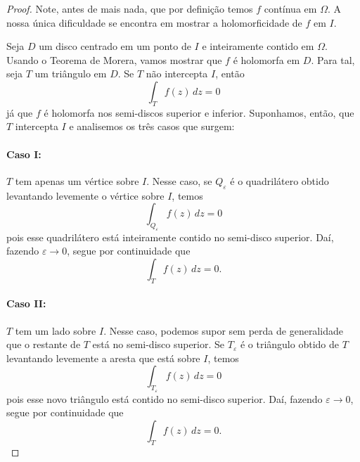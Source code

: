     \begin{proof}
        Note, antes de mais nada, que por definição temos $f$ contínua em $\Omega$.
        A nossa única dificuldade se encontra em mostrar a holomorficidade de $f$ em $I$.
        
        Seja $D$ um disco centrado em um ponto de $I$ e inteiramente contido em $\Omega$.
        Usando o Teorema de Morera, vamos mostrar que $f$ é holomorfa em $D$. Para tal,
        seja $T$ um triângulo em $D$. Se $T$ não intercepta $I$, então
        \begin{equation*}
            \int_T f(z) \, dz = 0
        \end{equation*}
        já que $f$ é holomorfa nos semi-discos superior e inferior. 
        Suponhamos, então, que $T$ intercepta $I$ e analisemos os três casos que surgem:
        \paragraph{Caso I:} $T$ tem apenas um vértice sobre $I$. Nesse caso, se 
        $Q_\varepsilon$ é o quadrilátero obtido levantando levemente o vértice sobre $I$, 
        temos
        \begin{equation*}
            \int_{Q_\varepsilon} f(z) \,dz = 0
        \end{equation*}
        pois esse quadrilátero está inteiramente contido no semi-disco superior. Daí,
        fazendo $\varepsilon\to 0$, segue por continuidade que
        \begin{equation*}
            \int_T f(z) \, dz = 0.
        \end{equation*}
        
        \paragraph{Caso II:} $T$ tem um lado sobre $I$. Nesse caso, podemos supor sem perda
        de generalidade que o restante de $T$ está no semi-disco superior. Se $T_\varepsilon$
        é o triângulo obtido de $T$ levantando levemente a aresta que está sobre $I$, temos
        \begin{equation*}
            \int_{T_\varepsilon} f(z) \, dz = 0
        \end{equation*}
        pois esse novo triângulo está contido no semi-disco superior. Daí, fazendo 
        $\varepsilon\to 0$, segue por continuidade que
        \begin{equation*}
            \int_T f(z) \, dz = 0.
        \end{equation*}
        

\end{proof}
